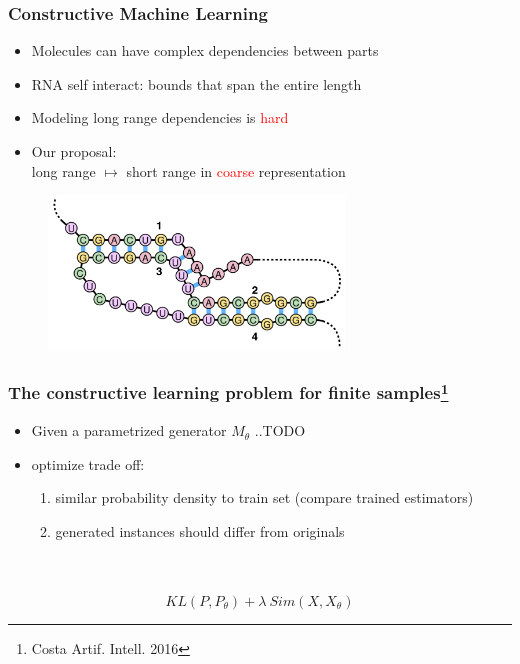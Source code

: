 \documentclass{beamer}
\newcommand{\red}[1]{\textcolor{red}{#1}}
\begin{document}
\begin{frame}
\frametitle{Constructive Machine Learning}

    \begin{itemize}
        \item Molecules can have complex dependencies between parts
        \item RNA self interact: bounds that span the entire length
        \item Modeling long range dependencies is \red{hard}
        \item Our proposal:\\ long range $\mapsto$ short range in \red{coarse} representation
    \end{itemize}
    \begin{figure}[ht]
        \centering
        \includegraphics[width=0.7\textwidth]{images/rna.png}
    \end{figure}    
\end{frame}

\begin{frame}
\frametitle{The constructive learning problem for finite samples\footnote{Costa Artif. Intell. 2016}}
    \begin{itemize}
        \item Given a parametrized generator $M_\theta$ ..TODO
        \item optimize trade off:
            \begin{enumerate}
        \item similar probability density to train set (compare trained estimators)
        \item generated instances should  differ from originals
            \end{enumerate}
    \end{itemize}
    ~\\
    ~\\
    $$KL(P,P_\theta) + \lambda  ~ Sim(X, X_\theta)$$
\end{frame}
\end{document}
